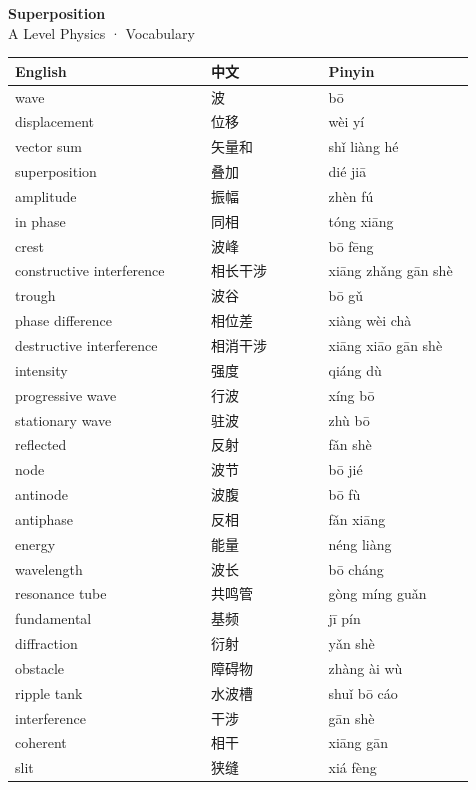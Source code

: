\documentclass[11pt]{article}
\begin{document}
\begin{center}
  {\LARGE\bfseries Superposition}\\[0.35em]
  {\large A Level Physics · Vocabulary}
\end{center}
\vspace{0.6em}

\begin{longtable}{@{}p{0.40\linewidth}p{0.24\linewidth}p{0.30\linewidth}@{}}
\toprule
\textbf{English} & \textbf{中文} & \textbf{Pinyin} \\
\midrule
\endhead
\bottomrule
\endlastfoot
wave & 波 & bō \\
displacement & 位移 & wèi yí \\
vector sum & 矢量和 & shǐ liàng hé \\
superposition & 叠加 & dié jiā \\
amplitude & 振幅 & zhèn fú \\
in phase & 同相 & tóng xiāng \\
crest & 波峰 & bō fēng \\
constructive interference & 相长干涉 & xiāng zhǎng gān shè \\
trough & 波谷 & bō gǔ \\
phase difference & 相位差 & xiàng wèi chà \\
destructive interference & 相消干涉 & xiāng xiāo gān shè \\
intensity & 强度 & qiáng dù \\
progressive wave & 行波 & xíng bō \\
stationary wave & 驻波 & zhù bō \\
reflected & 反射 & fǎn shè \\
node & 波节 & bō jié \\
antinode & 波腹 & bō fù \\
antiphase & 反相 & fǎn xiāng \\
energy & 能量 & néng liàng \\
wavelength & 波长 & bō cháng \\
resonance tube & 共鸣管 & gòng míng guǎn \\
fundamental & 基频 & jī pín \\
diffraction & 衍射 & yǎn shè \\
obstacle & 障碍物 & zhàng ài wù \\
ripple tank & 水波槽 & shuǐ bō cáo \\
interference & 干涉 & gān shè \\
coherent & 相干 & xiāng gān \\
slit & 狭缝 & xiá fèng \\

\end{longtable}
\end{document}
